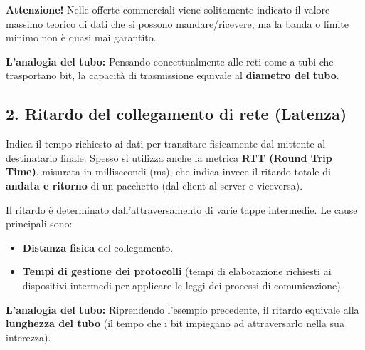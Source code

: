 \documentclass[a4paper,12pt]{report}
\begin{document}
\begin{notebox}{\textbf{Attenzione!}}
Nelle offerte commerciali viene solitamente indicato il valore massimo teorico di dati che si possono mandare/ricevere, ma la banda o limite minimo non è quasi mai garantito.
\end{notebox}

\textbf{L'analogia del tubo:} Pensando concettualmente alle reti come a tubi che trasportano bit, la capacità di trasmissione equivale al \textbf{diametro del tubo}.

\subsection*{2. Ritardo del collegamento di rete (Latenza)}
\begin{defbox}{}
Indica il tempo richiesto ai dati per transitare fisicamente dal mittente al destinatario finale. Spesso si utilizza anche la metrica \textbf{RTT (Round Trip Time)}, misurata in millisecondi (ms), che indica invece il ritardo totale di \textbf{andata e ritorno} di un pacchetto (dal client al server e viceversa).
\end{defbox}

Il ritardo è determinato dall'attraversamento di varie tappe intermedie. Le cause principali sono:
\begin{itemize}
    \item \textbf{Distanza fisica} del collegamento.
    \item \textbf{Tempi di gestione dei protocolli} (tempi di elaborazione richiesti ai dispositivi intermedi per applicare le leggi dei processi di comunicazione).
\end{itemize}

\textbf{L'analogia del tubo:} Riprendendo l'esempio precedente, il ritardo equivale alla \textbf{lunghezza del tubo} (il tempo che i bit impiegano ad attraversarlo nella sua interezza).
\end{document}
